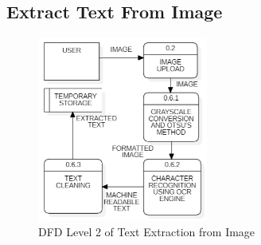 \subsection{Extract Text From Image}

\begin{figure}[h!]  
    \centering
    \includegraphics[width=0.5\textwidth]{Images/DFD L2 TEXT EXTRACT.png}  
    \caption{DFD Level 2 of Text Extraction from Image}
    \label{dfdl13456}  %
\end{figure}

